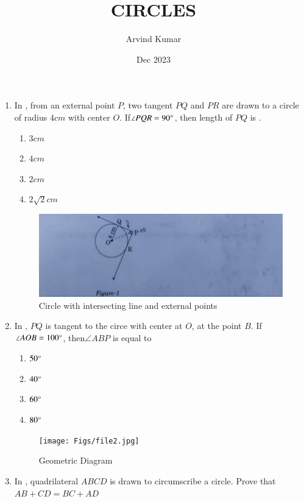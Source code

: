 \documentclass[12pt,-letter paper]{article}
\title{CIRCLES}
\author{Arvind Kumar}
\date{Dec 2023}
\begin{document}
\maketitle
\begin{enumerate}
	\item In , from an external point $P$, two tangent $PQ$ and $PR$ are drawn to a circle of radius $4cm$ with center $O$. If$\angle{PQR}=90\degree$, then length of $PQ$ is \underline {\hspace{4cm}}.
\begin{enumerate}[label=(\alph*)]
\item $3cm$ 
\item $4cm$
\item $2cm$
\item $2{\sqrt{2}}cm$ 
\end{enumerate}
\begin{figure}[H]
\centering
\includegraphics[width=\columnwidth]{Figs/file1.jpg}
\caption{Circle with intersecting line and external points}
\label{fig:Figure1}
\end{figure}
\item In , $PQ$ is tangent to the circe with center at $O$, at the point $B$. If$\angle{AOB}=100\degree$, then$\angle{ABP}$ is equal to\newline
\begin{enumerate}[label=(\alph*)] 
\item $50\degree$ 
\item $40\degree$ 
\item $60\degree$ 
\item $80\degree$
\end{enumerate}
\begin{figure}[H]
\centering
\texttt{[image: Figs/file2.jpg]}
\caption{Geometric Diagram}
\label{fig:Figure2}
\end{figure}
\item In , quadrilateral $ABCD$ is drawn to circumscribe a circle. Prove that\newline
$AB+CD=BC+AD$

\end{enumerate}
\end{document}
